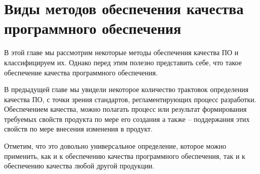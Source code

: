 \section{Виды методов обеспечения качества программного обеспечения}

В этой главе мы рассмотрим некоторые методы обеспечения качества ПО и классифицируем их. Однако перед этим полезно представить себе, что такое обеспечение качества программного обеспечения.

В предыдущей главе мы увидели некоторое количество трактовок определения качества ПО, с точки зрения стандартов, регламентирующих процесс разработки. Обеспечением качества, можно полагать процесс или результат формирования требуемых свойств продукта по мере его создания а также -- поддержания этих свойств по мере внесения изменения в продукт.

Отметим, что это довольно универсальное определение, которое можно применить, как и к обеспечению качества программного обеспечения, так и к обеспечению качества любой другой продукции.




